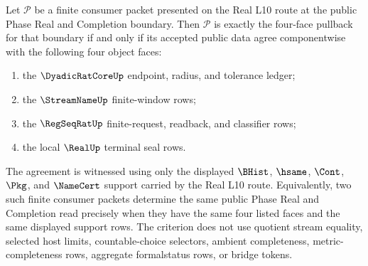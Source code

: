 \begin{theorem}
\label{thm:real-l10-four-face-public-pullback-criterion}
Let $\mathcal{P}$ be a finite consumer packet presented on the Real L10 route
at the public Phase Real and Completion boundary. Then $\mathcal{P}$ is
exactly the four-face pullback for that boundary if and only if its accepted
public data agree componentwise with the following four object faces:
\begin{enumerate}
\item the $\DyadicRatCoreUp$ endpoint, radius, and tolerance ledger;
\item the $\StreamNameUp$ finite-window rows;
\item the $\RegSeqRatUp$ finite-request, readback, and classifier rows;
\item the local $\RealUp$ terminal seal rows.
\end{enumerate}
The agreement is witnessed using only the displayed $\BHist$, $\hsame$,
$\Cont$, $\Pkg$, and $\NameCert$ support carried by the Real L10 route.
Equivalently, two such finite consumer packets determine the same public
Phase Real and Completion read precisely when they have the same four listed
faces and the same displayed support rows. The criterion does not use
quotient stream equality, selected host limits, countable-choice selectors,
ambient completeness, metric-completeness rows, aggregate formalstatus rows,
or bridge tokens.
\end{theorem}
